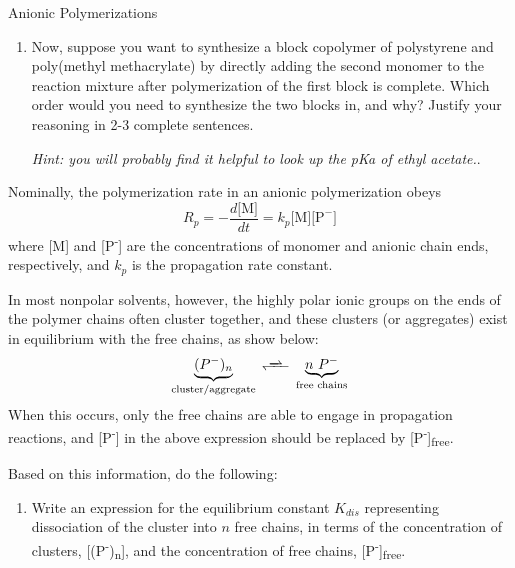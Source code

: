 \begin{activity}{Anionic Polymerizations}
\begin{exercises}
\begin{enumerate}
			
			\item Now, suppose you want to synthesize a block copolymer of polystyrene and poly(methyl methacrylate) by directly adding the second monomer to the reaction mixture after polymerization of the first block is complete.  Which order would you need to synthesize the two blocks in, and why?  Justify your reasoning in 2-3 complete sentences.
			
				\emph{Hint: you will probably find it helpful to look up the pKa of ethyl acetate.}.
			
				\begin{solution}\end{solution}
				
		\end{enumerate}

	\exercise Nominally, the polymerization rate in an anionic polymerization obeys
		\begin{equation*}
			R_p = -\frac{d\text{[M]}}{dt} = k_p\text{[M][P}^-\text{]}
		\end{equation*}
		where [M] and [P\textsuperscript{-}] are the concentrations of monomer and anionic chain ends, respectively, and $k_p$ is the propagation rate constant.
		
		In most nonpolar solvents, however, the highly polar ionic groups on the ends of the polymer chains often cluster together, and these clusters (or aggregates) exist in equilibrium with the free chains, as show below:
			\begin{equation*}
				\underbrace{(P^-)_n}_{\text{cluster/aggregate}} \ce{<<=>} \underbrace{n\,\,P^-}_{\text{free chains}}
			\end{equation*}
		When this occurs, only the free chains are able to engage in propagation reactions, and [P\textsuperscript{-}] in the above expression should be replaced by [P\textsuperscript{-}]\textsubscript{free}.
		
		Based on this information, do the following:
		\begin{enumerate}
			\item Write an expression for the equilibrium constant $K_{dis}$ representing dissociation of the cluster into $n$ free chains, in terms of the concentration of clusters, [(P\textsuperscript{-})\textsubscript{n}], and the concentration of free chains, [P\textsuperscript{-}]\textsubscript{free}.
				

\end{enumerate}
\end{exercises}
\end{activity}
